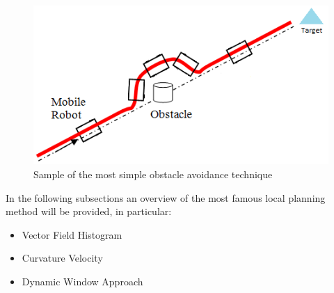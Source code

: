 \begin{figure}[H]
    \centering
    \includegraphics[scale = 0.5]{Images/Chapter 4/obstacleavoidance.png}
    \caption{Sample of the most simple obstacle avoidance technique}
    \label{fig:obstacleavoidance}
\end{figure}
In the following subsections an overview of the most famous local planning method will be provided, in particular:
\begin{itemize}
    \item Vector Field Histogram
    \item Curvature Velocity
    \item Dynamic Window Approach
\end{itemize}
